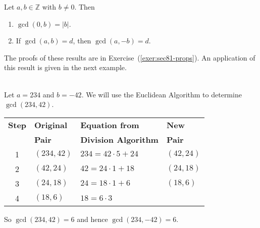 \begin{lemma} \label{L:moregcd}
Let $a, b \in \mathbb{Z}$ with  $b \ne 0$.  Then

\begin{enumerate}
\item $\gcd( {0, b} ) = \left| b \right|$.

\item If  $\gcd( {a, b} ) = d$, then $\gcd( {a,  - b} ) = d$.

\end{enumerate}
\end{lemma}

\noindent
The  proofs of these results are in Exercise~(\ref{exer:sec81-props}).  An application of this result is given in the next example.

\begin{example}\label{E:euclidalgo} \hfill \\
Let  $a = 234$  and  $b =  - 42$.  We will use the Euclidean Algorithm to determine  
$\gcd( {234, 42} )$.

\begin{center}
\begin{tabular}[h]{| c | l | l | l |}
  \hline
\textbf{Step}  &  \textbf{Original}  &  \textbf{Equation from}    &  \textbf{New}    \\
 &  \textbf{Pair}     &  \textbf{Division Algorithm} &  \textbf{Pair}  \\ \hline
1 & $\left( {234, 42} \right)$  &  $234 = 42 \cdot 5 + 24$ &  $\left( {42, 24} \right)$  \\ \hline
2 & $\left( {42, 24} \right)$  &	$42 = 24 \cdot 1 + 18$  &  $\left( {24, 18} \right)$  \\ \hline
3 & $\left( {24, 18} \right)$  &	$24 = 18 \cdot 1 + 6$   &  $\left( {18, 6} \right)$   \\ \hline
4 & $\left( {18, 6} \right)$   &	$18 = 6 \cdot 3$        &                             \\ \hline
\end{tabular}
\end{center}

\noindent
So  $\gcd( {234, 42} ) = 6$ and hence $\gcd( {234,  - 42} ) = 6$.
\end{example}
\hbreak

\endinput
